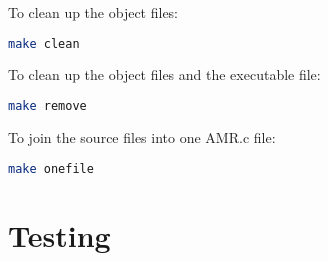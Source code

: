 \documentclass[12pt,a4paper]{report}
\begin{document}
To clean up the object files:
\begin{lstlisting}[language=bash,basicstyle=\ttfamily,keywordstyle=\bfseries]
make clean
\end{lstlisting}

To clean up the object files and the executable file:
\begin{lstlisting}[language=bash,basicstyle=\ttfamily,keywordstyle=\bfseries]
make remove
\end{lstlisting}

To join the source files into one AMR.c file:
\begin{lstlisting}[language=bash,basicstyle=\ttfamily,keywordstyle=\bfseries]
make onefile
\end{lstlisting}
\appendix
\chapter{Testing}
\label{Appendix:Testing}
\end{document}

